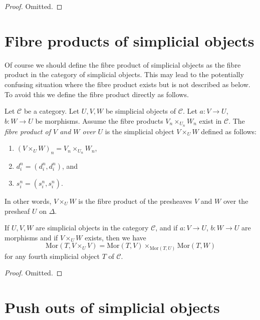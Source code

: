 \begin{proof}
Omitted.
\end{proof}


\section{Fibre products of simplicial objects}
\label{section-fibre-products}

\noindent
Of course we should define the fibre product of simplicial objects
as the fibre product in the category of simplicial objects. This
may lead to the potentially confusing situation where the
fibre product exists but is not described as below. To avoid
this we define the fibre product directly as follows.

\begin{definition}
\label{definition-fibre-product}
Let $\mathcal{C}$ be a category.
Let $U, V, W$ be simplicial objects of $\mathcal{C}$.
Let $a : V \to U$, $b : W \to U$ be morphisms.
Assume the fibre products $V_n \times_{U_n} W_n$ exist in $\mathcal{C}$.
The {\it fibre product of $V$ and $W$ over $U$} is the simplicial object
$V\times_U W$ defined as follows:
\begin{enumerate}
\item $(V \times_U W)_n = V_n \times_{U_n} W_n$,
\item $d^n_i = (d^n_i, d^n_i)$, and
\item $s^n_i = (s^n_i, s^n_i)$.
\end{enumerate}
In other words, $V\times_U W$ is the fibre product of the presheaves
$V$ and $W$ over the presheaf $U$ on $\Delta$.
\end{definition}

\begin{lemma}
\label{lemma-fibre-product}
If $U, V, W$ are simplicial objects in the category $\mathcal{C}$,
and if $a : V \to U$, $b : W \to U$ are morphisms
and if $V\times_U W$ exists, then we have
$$
\text{Mor}(T, V\times_U V) =
\text{Mor}(T, V) \times_{\text{Mor}(T, U)}
\text{Mor}(T, W)
$$
for any fourth simplicial object $T$ of $\mathcal{C}$.
\end{lemma}

\begin{proof}
Omitted.
\end{proof}

\section{Push outs of simplicial objects}
\label{section-push-outs}

